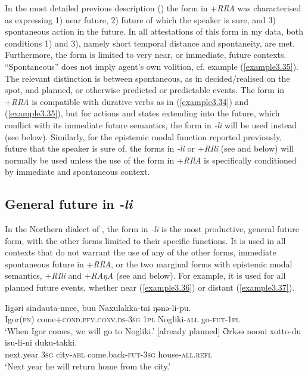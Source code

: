 \documentclass[output=paper,colorlinks,citecolor=brown]{langscibook}
\begin{document}
In the most detailed previous description (\citealt{Ikegami_1959}) the form in +\textit{RIlA} was characterised as expressing 1) near future, 2) future of which the speak\-er is sure, and 3) spontaneous action in the future. In all attestations of this form in my data, both conditions 1) and 3), namely short temporal distance and spontaneity, are met. Furthermore, the form is limited to very near, or immediate, future contexts. “Spontaneous” does not imply agent’s own volition, cf. example (\ref{example3.35}). The relevant distinction is between spontaneous, as in decided/realised on the spot, and planned, or otherwise predicted or predictable events. The form in +\textit{RIlA} is compatible with durative verbs as in (\ref{example3.34}) and (\ref{example3.35}), but for actions and states extending into the future, which conflict with its immediate future semantics, the form in \textit{-li} will be used instead (see below). Similarly, for the epistemic modal function reported previously, future that the speaker is sure of, the forms in \textit{-li} or +\textit{RIli} (see  and  below) will normally be used unless the use of the form in +\textit{RIlA} is specifically conditioned by immediate and spontaneous context.


\subsection{General future in \textit{-li}}\label{Section3.5.2}

In the Northern dialect of , the form in \textit{-li} is the most productive, general future form, with the other forms limited to their specific functions. It is used in all contexts that do not warrant the use of any of the other forms, immediate spontaneous future in +\textit{RIlA}, or the two marginal forms with epistemic modal semantics, +\textit{RIli} and +\textit{RAŋA} (see  and  below). For example, it is used for all planned future events, whether near (\ref{example3.36}) or distant (\ref{example3.37}).

\ea
\label{example3.36}
\gll Iigəri	sindauta-nnee,				buu		Naxulakka-tai	ŋənə-li-pu.\\
    	Igor(\textsc{pn})	come+\textsc{cond}.\textsc{pfv}.\textsc{conv}.\textsc{ds}-\textsc{3sg}	\textsc{1pl}		Nogliki-\textsc{all}		go-\textsc{fut}-\textsc{1pl}\\
\glt `When Igor comes, we will go to Nogliki.’ [already planned]
\ex
\label{example3.37}
\gll Ərkəə		nooni	xotto-du		isu-li-ni			duku-takki.\\
    	next.year		\textsc{3sg}		city-\textsc{abl}		come.back-\textsc{fut}-\textsc{3sg}	house-\textsc{all}.\textsc{refl}\\
\glt `Next year he will return home from the city.’
\z
\end{document}
